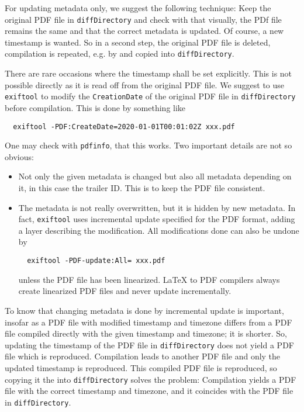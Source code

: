 For updating metadata only, we suggest the following technique: 
Keep the original PDF file in \texttt{diffDirectory} 
and check with  that visually, the PDf file remains the same 
and that the correct metadata is updated. 
Of course, a new timestamp is wanted. 
So in a second step, the original PDF file is deleted, 
compilation is repeated, e.g. by  and copied into \texttt{diffDirectory}. 
\medskip


There are rare occasions where the timestamp shall be set explicitly. 
This is not possible directly as it is read off from the original PDF file. 
We suggest to use \texttt{exiftool} to modify the \texttt{CreationDate} 
of the original PDF file in \texttt{diffDirectory} before compilation. 
This is done by something like
%
\begin{verbatim}
  exiftool -PDF:CreateDate=2020-01-01T00:01:02Z xxx.pdf 
\end{verbatim}

One may check with \texttt{pdfinfo}, that this works. 
Two important details are not so obvious: 
%
\begin{itemize}
\item
Not only the given metadata is changed but also all metadata depending on it, 
in this case the trailer ID. 
This is to keep the PDF file consistent. 
\item 
The metadata is not really overwritten, but it is hidden by new metadata. 
In fact, \texttt{exiftool} uses incremental update specified for the PDF format, 
adding a layer describing the modification. 
All modifications done can also be undone by 
%
\begin{verbatim}
  exiftool -PDF-update:All= xxx.pdf
\end{verbatim}
%
unless the PDF file has been linearized. 
\LaTeX{} to PDF compilers always create linearized PDF files and never update incrementally. 
\end{itemize}


To know that changing metadata is done by incremental update is important, 
insofar as a PDF file with modified timestamp and timezone  
differs from a PDF file compiled directly with the given timestamp and timezone; 
it is shorter. 
So, updating the timestamp of the PDF file in \texttt{diffDirectory} 
does not yield a PDF file which is reproduced. 
Compilation leads to another PDF file and only the updated timestamp is reproduced. 
This compiled PDF file is reproduced, so 
copying it the into \texttt{diffDirectory} solves the problem: 
Compilation yields a PDF file with the correct timestamp and timezone, 
and it coincides with the PDF file in \texttt{diffDirectory}. 







